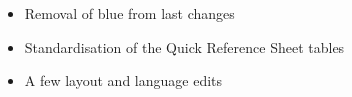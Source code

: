 

\subtitle{beta 2.1.5}

\begin{itemize}
\item Removal of blue from last changes
\item Standardisation of the Quick Reference Sheet tables
\item A few layout and language edits
\end{itemize}
